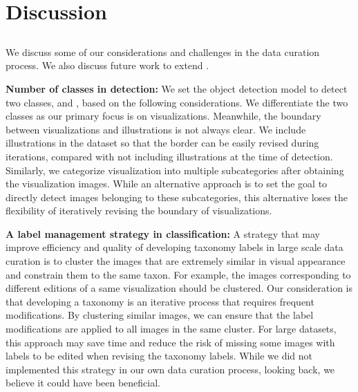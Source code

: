 \section{Discussion}
\label{sec:discussion}


\subsection{}
\label{sec:lesson}

We discuss some of our considerations and challenges in the data curation process.
We also discuss future work to extend \datasetName.

\textbf{Number of classes in detection:}
We set the object detection model to detect two classes,  and , based on the following considerations.
We differentiate the two classes as our primary focus is on visualizations.
Meanwhile, the boundary between visualizations and illustrations is not always clear.
We include illustrations in the dataset so that the border can be easily revised during iterations, compared with not including illustrations at the time of detection.
Similarly, we categorize visualization into multiple subcategories after obtaining the visualization images.
While an alternative approach is to set the goal to directly detect images belonging to these subcategories, this alternative loses the flexibility of iteratively revising the boundary of visualizations.



\textbf{A label management strategy in classification:}
A strategy that may improve efficiency and quality of developing taxonomy labels in large scale data curation is to cluster the images that are extremely similar in visual appearance and constrain them to the same taxon.
For example, the images corresponding to different editions of a same visualization should be clustered.
Our consideration is that developing a taxonomy is an iterative process that requires frequent modifications.
By clustering similar images, we can ensure that the label modifications are applied to all images in the same cluster.
For large datasets, this approach may save time and reduce the risk of missing some images with labels to be edited when revising the taxonomy labels.
While we did not implemented this strategy in our own data curation process, looking back, we believe it could have been beneficial.


